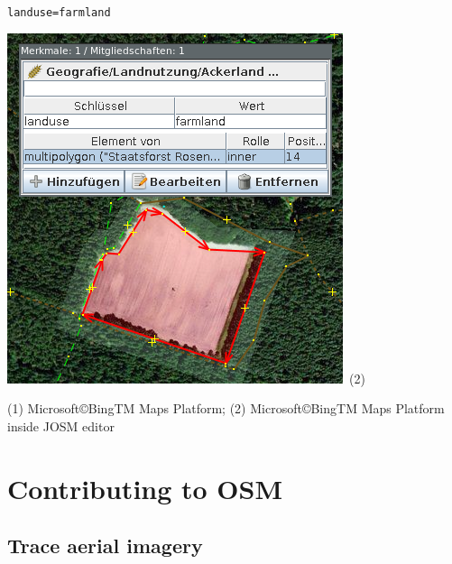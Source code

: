 \documentclass{beamer}
\begin{document}
\begin{frame}
\begin{center}
			\begin{minipage}[b][0.6\textheight][c]{0.3\linewidth}
				\texttt{landuse=farmland}
				\begin{center}
					\includegraphics[width=\linewidth,height=\textheight,keepaspectratio]{images/multipolygon_josm.png}~\tiny{(2)}
				\end{center}
			\end{minipage}
		\end{center}
		{\tiny (1) Microsoft\copyright BingTM Maps Platform; (2) Microsoft\copyright BingTM Maps Platform inside JOSM editor}
	\end{frame}

	\section{Contributing to OSM}
	
	\subsection{Trace aerial imagery}
	
\end{document}
